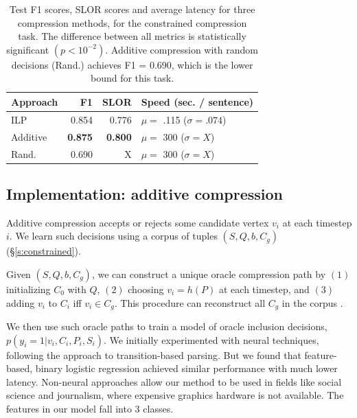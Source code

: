 \documentclass[11pt,a4paper]{article}
\begin{document}
\begin{table}[]
\begin{tabular}{lrrl}
\centering
Approach & F1 & SLOR &  Speed {\small (sec. / sentence)}  \\ \hline
ILP &  {\small 0.854}   &  {\small 0.776 }  & {\small $\mu=$ .115} ({\small $ \sigma=.074$}) \\
Additive &  {\small \textbf{0.875}}  & {\small \textbf{0.800} }& {\small $\mu=$ 300} ({\small $ \sigma=X$}) \\
Rand.  &  {\small 0.690}  & { X }& {\small $\mu=$ 300} ({\small $ \sigma=X$}) \\
\end{tabular}
\caption{Test F1 scores, SLOR scores and average latency for three compression methods, for the constrained compression task. The difference between all metrics is statistically significant {\small $(p < 10^{-2})$}. Additive compression with random decisions (Rand.) achieves F1 = 0.690, which is the lower bound for this task.}
\label{t:results}
\end{table}

\subsection{Implementation: additive compression}\label{s:transition}

Additive compression accepts or rejects some candidate vertex $v_i$ at each timestep $i$. 
We learn such decisions using a corpus of tuples $(S,Q,b,C_g)$ (\S\ref{s:constrained}). 

Given $(S,Q,b,C_g)$, we can construct a unique oracle compression path by $(1)$ initializing $C_0$ with $Q$, $(2)$ choosing $v_i = h(P)$ at each timestep, and $(3)$ adding $v_i$ to $C_i$ iff $v_i \in C_g$. This procedure can reconstruct all $C_g$ in the corpus \cite{filippova2013overcoming}. 

We then use such oracle paths to train a model of oracle inclusion decisions, ${p(y_i  = 1 | v_i, C_i, P_i, S_i)}$. We initially experimented with neural techniques, following the \citet{D14-1082} approach to transition-based parsing. But we found that feature-based, binary logistic regression achieved similar performance with much lower latency. Non-neural approaches allow our method to be used in fields like social science and journalism, where expensive graphics hardware is not available. The features in our model fall into 3 classes.
\end{document}
